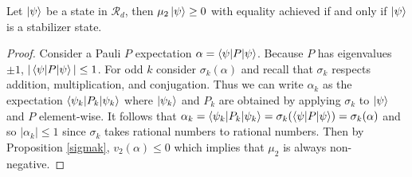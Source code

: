 \documentclass[12pt]{dalthesis}
\begin{document}
\begin{proposition}
Let $\ket{\psi}$ be a state in $\mathcal{R}_d$, then $\mu_2\ket{\psi} \geq 0$ with equality achieved if and only if $\ket{\psi}$ is a stabilizer state. 
\end{proposition}
\begin{proof}
Consider a Pauli $P$ expectation $\alpha = \braket{\psi |P| \psi}$. Because $P$ has eigenvalues $\pm 1$, $|\braket{\psi |P| \psi}| \leq 1$. For odd $k$ consider $\sigma_k(\alpha)$ and recall that $\sigma_k$ respects addition, multiplication, and conjugation. Thus we can write $\alpha_k$ as the expectation $\braket{\psi_k |P_k| \psi_k}$ where $\ket{\psi_k}$ and $P_k$ are obtained by applying $\sigma_k$ to $\ket{\psi}$ and $P$ element-wise. It follows that $\alpha_k = \braket{\psi_k |P_k| \psi_k} = \sigma_k (\braket{\psi |P| \psi}) = \sigma_k (\alpha)$ and so $|\alpha_k| \leq 1$ since $\sigma_k$ takes rational numbers to rational numbers. Then by Proposition \ref{sigmak}, $v_2(\alpha) \leq 0$ which implies that $\mu_2$ is always non-negative. 


\end{proof}
\end{document}
